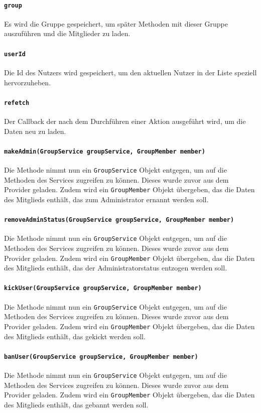 \documentclass{implementierungsheft}
\begin{document}
\paragraph{\texttt{group}}
Es wird die Gruppe gespeichert, um später Methoden mit dieser Gruppe auszuführen und die Mitglieder zu laden.
\paragraph{\texttt{userId}}
Die Id des Nutzers wird gespeichert, um den aktuellen Nutzer in der Liste speziell hervorzuheben.
\paragraph{\texttt{refetch}}
Der Callback der nach dem Durchführen einer Aktion ausgeführt wird, um die Daten neu zu laden.
\paragraph{\texttt{makeAdmin(GroupService groupService, GroupMember member)}}
Die Methode nimmt nun ein \texttt{GroupService} Objekt entgegen, um auf die Methoden des Services zugreifen zu können. Dieses wurde zuvor aus dem Provider geladen. Zudem wird ein \texttt{GroupMember} Objekt übergeben, das die Daten des Mitglieds enthält, das zum Administrator ernannt werden soll.
\paragraph{\texttt{removeAdminStatus(GroupService groupService, GroupMember member)}}
Die Methode nimmt nun ein \texttt{GroupService} Objekt entgegen, um auf die Methoden des Services zugreifen zu können. Dieses wurde zuvor aus dem Provider geladen. Zudem wird ein \texttt{GroupMember} Objekt übergeben, das die Daten des Mitglieds enthält, das der Administratorstatus entzogen werden soll.
\paragraph{\texttt{kickUser(GroupService groupService, GroupMember member)}}
Die Methode nimmt nun ein \texttt{GroupService} Objekt entgegen, um auf die Methoden des Services zugreifen zu können. Dieses wurde zuvor aus dem Provider geladen. Zudem wird ein \texttt{GroupMember} Objekt übergeben, das die Daten des Mitglieds enthält, das gekickt werden soll.
\paragraph{\texttt{banUser(GroupService groupService, GroupMember member)}}
Die Methode nimmt nun ein \texttt{GroupService} Objekt entgegen, um auf die Methoden des Services zugreifen zu können. Dieses wurde zuvor aus dem Provider geladen. Zudem wird ein \texttt{GroupMember} Objekt übergeben, das die Daten des Mitglieds enthält, das gebannt werden soll.
\end{document}
